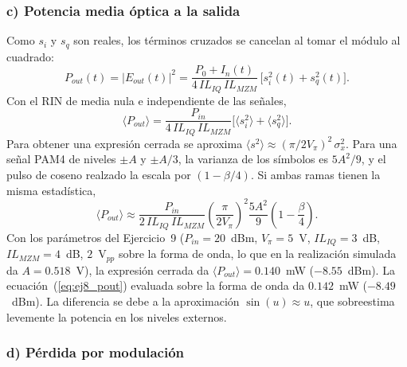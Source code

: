 \subsubsection*{c) Potencia media óptica a la salida}

Como $s_i$ y $s_q$ son reales, los términos cruzados se cancelan al tomar
el módulo al cuadrado:
%
\begin{equation}
P_{out}(t) = |E_{out}(t)|^2 =
\frac{P_0 + I_n(t)}{4\,IL_{IQ}\,IL_{MZM}}\,\big[s_i^2(t) + s_q^2(t)\big].
\end{equation}
%
Con el RIN de media nula e independiente de las señales,
%
\begin{equation}
\langle P_{out}\rangle = \frac{P_{in}}{4\,IL_{IQ}\,IL_{MZM}}
\Big[\big\langle s_i^2\big\rangle + \big\langle s_q^2\big\rangle\Big].
\label{eq:ej8_pout}
\end{equation}
%
Para obtener una expresión cerrada se aproxima
$\langle s^2\rangle \approx (\pi/2V_\pi)^2\,\sigma_x^2$. Para una señal
PAM4 de niveles $\pm A$ y $\pm A/3$, la varianza de los símbolos es
$5A^2/9$, y el pulso de coseno realzado la escala por $(1-\beta/4)$. Si
ambas ramas tienen la misma estadística,
%
\begin{equation}
\langle P_{out}\rangle \approx \frac{P_{in}}{2\,IL_{IQ}\,IL_{MZM}}
\left(\frac{\pi}{2V_\pi}\right)^{2}\frac{5A^2}{9}\left(1-\frac{\beta}{4}\right).
\end{equation}
%
Con los parámetros del Ejercicio~9 ($P_{in} = 20$~dBm, $V_\pi = 5$~V,
$IL_{IQ} = 3$~dB, $IL_{MZM} = 4$~dB, $2$~V$_{pp}$ sobre la forma de onda,
lo que en la realización simulada da $A = 0.518$~V), la expresión cerrada
da $\langle P_{out}\rangle = 0.140$~mW ($-8.55$~dBm). La
ecuación~(\ref{eq:ej8_pout}) evaluada sobre la forma de onda da
$0.142$~mW ($-8.49$~dBm). La diferencia se debe a la aproximación
$\sin(u) \approx u$, que sobreestima levemente la potencia en los niveles
externos.

\subsubsection*{d) Pérdida por modulación}

